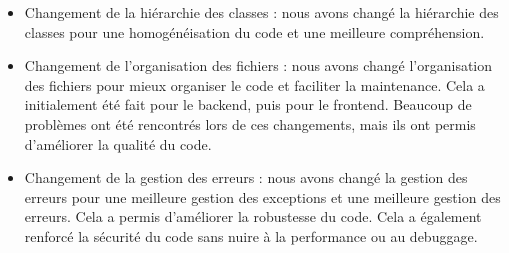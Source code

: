 \begin{itemize}
    \item Changement de la hiérarchie des classes : nous avons changé la hiérarchie des classes pour
    une homogénéisation du code et une meilleure compréhension.
    \item Changement de l'organisation des fichiers : nous avons changé l'organisation des fichiers pour
    mieux organiser le code et faciliter la maintenance. Cela a initialement été fait pour le backend, puis
    pour le frontend. Beaucoup de problèmes ont été rencontrés lors de ces changements, mais ils ont permis
    d'améliorer la qualité du code.
    \item Changement de la gestion des erreurs : nous avons changé la gestion des erreurs pour une meilleure
    gestion des exceptions et une meilleure gestion des erreurs. Cela a permis d'améliorer la robustesse du code.
    Cela a également renforcé la sécurité du code sans nuire à la performance ou au debuggage.
\end{itemize}
